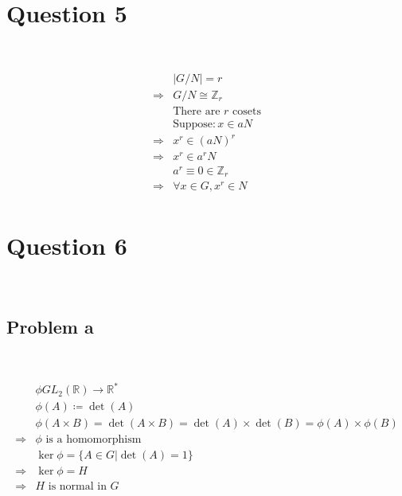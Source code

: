 \documentclass{article}
\begin{document}
\newpage

\section*{Question 5}

~

\begin{equation*}
    \begin{split}
        &|G/N|=r\\
        \Rightarrow&G/N\cong\mathbb{Z} _r\\
        &\text{There are }r\text{ cosets}\\
        &\text{Suppose}: x\in aN\\
        \Rightarrow&x^r\in (aN)^r\\
        \Rightarrow&x^r\in a^rN\\
        &a^r\equiv 0\in \mathbb{Z} _r\\
        \Rightarrow&\forall x\in G,x^r\in N\\
    \end{split}
\end{equation*}

\newpage

\section*{Question 6}

~

\subsection*{Problem a}

~

\begin{equation*}
    \begin{split}
        &\phi GL_2(\mathbb{R} )\rightarrow\mathbb{R}^* \\
        &\phi(A)\coloneqq\det(A)\\
        &\phi(A\times B)=\det(A\times B)=\det(A)\times\det(B)=\phi(A)\times\phi(B)\\
        \Rightarrow&\phi\text{ is a homomorphism}\\
        &\ker\phi=\{A\in G|\det(A)=1\}\\
        \Rightarrow&\ker\phi=H\\
        \Rightarrow&H\text{ is normal in }G\\
    \end{split}
\end{equation*}
\end{document}
